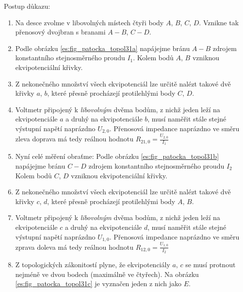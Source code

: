         Postup důkazu:
        \begin{enumerate}[noitemsep]
          \item Na desce zvolme v libovolných místech čtyři body \(A\), \(B\), \(C\), \(D\).    
                Vznikne tak přenosový dvojbran s branami \(A-B\), \(C-D\).
          
          \item Podle obrázku \ref{es:fig_patocka_topol31a} napájejme bránu \(A-B\) zdrojem 
                konstantního stejnosměrného proudu \(I_1\). Kolem bodů \(A\), \(B\) vzniknou 
                ekvipotenciální křivky.
          
          \item Z nekonečného množství všech ekvipotenciál lze určitě nalézt takové dvě křivky 
               \(a\), \(b\), které přesně procházejí protilehlými body \(C\), \(D\).
          
          \item Voltmetr připojený k \emph{libovolným} dvěma bodům, z nichž jeden leží na 
                ekvipotenciále \(a\) a druhý na ekvipotenciále \(b\), musí naměřit stále stejné 
                výstupní napětí naprázdno \(U_{2,0}\). Přenosová impedance naprázdno ve směru zleva 
                doprava má tedy reálnou hodnotu \(R_{21,0} = \frac{U_{2,0}}{I_1}\)
          
          \item Nyní celé měření obraťme: Podle obrázku \ref{es:fig_patocka_topol31b} napájejme 
                bránu \(C-D\) zdrojem konstantního stejnosměrného proudu \(I_2\) Kolem bodů \(C\), 
                \(D\) vzniknou ekvipotenciální křivky.
          
          \item Z nekonečného množství všech ekvipotenciál lze určitě nalézt takové dvě křivky 
                \(c\), \(d\), které přesně procházejí protilehlými body \(A\), \(B\).
          
          \item Voltmetr připojený k \emph{libovolným} dvěma bodům, z nichž jeden leží na
                ekvipotenciále \(c\) a druhý na ekvipotenciále \(d\), musí naměřit stále stejné
                výstupní napětí naprázdno \(U_{1,0}\). Přenosová impedance naprázdno ve směru zprava
                doleva má tedy reálnou hodnotu \(R_{12,0} = \frac{U_{1,0}}{I_2}\)
          
          \item Z topologických zákonitostí plyne, že ekvipotenciály \(a\), \(c\) se musí protnout 
                nejméně ve dvou bodech (maximálně ve čtyřech). Na obrázku 
                \ref{es:fig_patocka_topol31c} je vyznačen jeden z nich jako \(E\).
          

\end{enumerate}
